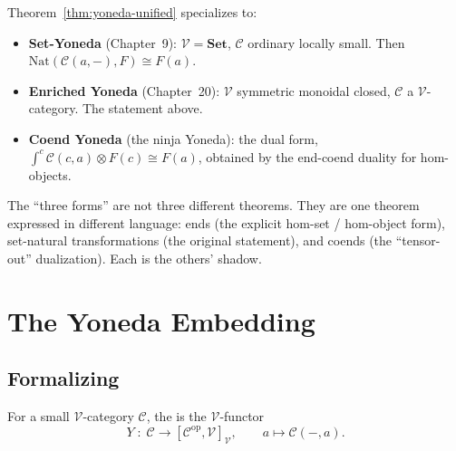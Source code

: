 \begin{corollary}
\label{cor:three-yonedas}
Theorem~\ref{thm:yoneda-unified} specializes to:
\begin{itemize}
  \item \textbf{Set-Yoneda} (Chapter~9): $\mathcal{V} = \mathbf{Set}$,
        $\mathcal{C}$ ordinary locally small. Then $\mathrm{Nat}
        (\mathcal{C}(a, -), F) \cong F(a)$.
  \item \textbf{Enriched Yoneda} (Chapter~20): $\mathcal{V}$ symmetric
        monoidal closed, $\mathcal{C}$ a $\mathcal{V}$-category. The
        statement above.
  \item \textbf{Coend Yoneda} (the ninja Yoneda): the dual form,
        $\int^c \mathcal{C}(c, a) \otimes F(c) \cong F(a)$, obtained by
        the end-coend duality for hom-objects.
\end{itemize}
\end{corollary}

\begin{remark}
The ``three forms'' are not three different theorems. They are one theorem
expressed in different language: ends (the explicit hom-set / hom-object
form), set-natural transformations (the original statement), and coends (the
``tensor-out'' dualization). Each is the others' shadow.
\end{remark}


\section{The Yoneda Embedding}
\label{sec:formal-yoneda-embedding}

\subsection{Formalizing}

\begin{definition}
\label{def:formal-yoneda-embedding}
For a small $\mathcal{V}$-category $\mathcal{C}$, the 
is the $\mathcal{V}$-functor
\begin{equation*}
  Y \;:\; \mathcal{C} \to [\mathcal{C}^{\mathrm{op}}, \mathcal{V}]_\mathcal{V},
  \qquad
  a \mapsto \mathcal{C}(-, a).
\end{equation*}
\end{definition}

